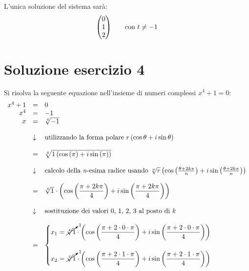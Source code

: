 \documentclass[a4paper]{article}
\makeatletter
\newenvironment{rowequmat}[1]{\left(\array{@{}#1@{}}}{\endarray\right)}
\makeatother
\begin{document}
	L'unica soluzione del sistema sarà:
	\begin{equation*}
		\begin{rowequmat}{c}
			0 \\
			1 \\
			2
		\end{rowequmat} \hspace{2em} \text{con } t \ne -1
	\end{equation*}\newpage

	\section{Soluzione esercizio 4}
	
	Si risolva la seguente equazione nell'insieme di numeri complessi $x^{4} + 1 = 0$:
	\begin{equation*}
		\begin{array}{rll}
			x^{4} + 1 & = & 0 \\
			x^{4} & = & -1 \\
			x & = & \sqrt[4]{-1} \\
			\\
			& \downarrow & \text{utilizzando la forma polare } r\left(\cos\theta + i \sin \theta\right) \\
			\\
			& = & \sqrt[4]{1 \left(\cos\left(\pi\right) + i \sin\left(\pi\right)\right)} \\
			\\
			& \downarrow & \text{calcolo della \emph{n}-esima radice usando } \sqrt[n]{r}\left(\cos\left(\frac{\theta+2k\pi}{n}\right) + i \sin\left(\frac{\theta+2k\pi}{n}\right)\right) \\
			\\
			& = & \sqrt[4]{1} \cdot \left(\cos\left(\dfrac{\pi + 2 k \pi}{4}\right) + i \sin\left(\dfrac{\pi + 2 k \pi}{4}\right)\right) \\
			\\
			& \downarrow & \text{sostituzione dei valori 0, 1, 2, 3 al posto di \emph{k}} \\
			\\
			& = & \begin{cases}
				x_{1} = \cancelto{1}{\sqrt[4]{1}} \cdot \left(\cos\left(\dfrac{\pi + 2 \cdot 0 \cdot \pi}{4}\right) + i \sin\left(\dfrac{\pi + 2 \cdot 0 \cdot \pi}{4}\right)\right)\\
				\\
				x_{2} = \cancelto{1}{\sqrt[4]{1}} \cdot \left(\cos\left(\dfrac{\pi + 2 \cdot 1 \cdot \pi}{4}\right) + i \sin\left(\dfrac{\pi + 2 \cdot 1 \cdot \pi}{4}\right)\right)\\

\end{cases}
\end{array}
\end{equation*}
\end{document}
